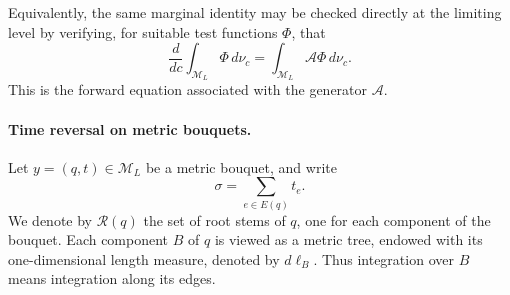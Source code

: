 \documentclass[11pt]{article}
\begin{document}
Equivalently, the same marginal identity may be checked directly at the
limiting level by verifying, for suitable test functions \(\Phi\), that
\[
\frac{d}{dc}\int_{\mathcal M_L}\Phi\,d\nu_c
=
\int_{\mathcal M_L}\mathcal A\Phi\,d\nu_c .
\]
This is the forward equation associated with the generator \(\mathcal A\).
%
%
\paragraph{Time reversal on metric bouquets.}
Let \(y=(q,t)\in\mathcal M_L\) be a metric bouquet, and write
\[
\sigma=\sum_{e\in E(q)}t_e .
\]
We denote by \(\mathcal R(q)\) the set of root stems of \(q\), one for each
component of the bouquet. Each component \(B\) of \(q\) is viewed as a metric
tree, endowed with its one-dimensional length measure, denoted by
\(d\ell_B\). Thus integration over \(B\) means integration along its edges.
\end{document}
